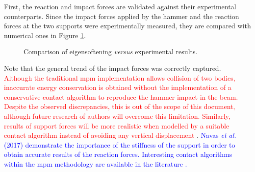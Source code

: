 \documentclass[preprint,12pt,a4paper]{elsarticle}
\newcommand{\PNA}[1]{
  \textcolor{red}{{#1}}
}
\newcommand{\MMP}[1]{
  \textcolor{blue}{{#1}}
}
\begin{document}
First, the reaction and impact forces are validated against their
experimental counterparts. Since the impact forces applied by the
hammer and the reaction forces at the two supports were experimentally
measured, they are compared with numerical ones in Figure
\ref{fig:Reactions-Forces-impact-test}. 
\begin{figure}
  \centering
  \caption{Comparison of eigensoftening \textit{versus} experimental results.}
  \label{fig:Reactions-Forces-impact-test}
\end{figure}
Note that the general trend of the impact forces was correctly
captured. \PNA{Although the traditional \acrshort{mpm} implementation allows collision of two bodies, inaccurate energy conservation is obtained without the implementation of a conservative contact algorithm to reproduce the hammer impact in the beam.
Despite the observed discrepancies, this is out of the scope of this
document, although future research of authors will overcome this
limitation. Similarly, results of support forces will be more
realistic when modelled by a suitable contact algorithm instead of
avoiding any vertical displacement}.\MMP{Navas {\it et al.}
(2017)\cite{Navas_2017_ES} demonstrate the importance of the stiffness
of the support in order to obtain accurate results of the reaction
forces. Interesting contact algorithms within the \acrshort{mpm}
methodology are available in the literature
\cite{Bardenhagen_Contact_2001,XZhang_Contact_2011}.}
\end{document}
